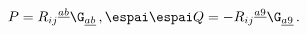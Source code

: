 \begin{equation} \label{define}
P= R_{ij}{}^{\underline{ab}}\G_{\underline{ab}} \,,  \espai\espai Q=
-R_{ij}{}^{\underline{a9}}\G_{\underline{a9}} \,.
\end{equation}

